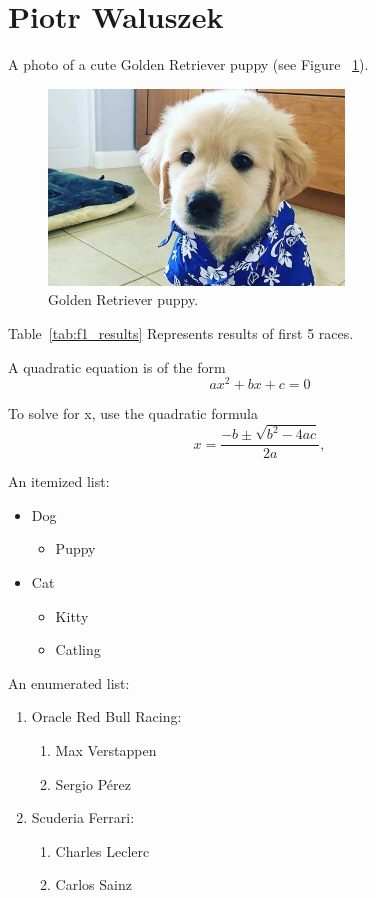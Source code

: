 \section{Piotr Waluszek}
\label{sec:piotrwalu}

A photo of a cute Golden Retriever puppy (see Figure ~\ref{fig:puppy}).

\begin{figure}[htbp]
    \centering
    \includegraphics[width=0.7\textwidth]{pictures/golden_retriever.jpg}
    \caption{Golden Retriever puppy.}
    \label{fig:puppy}
\end{figure}

Table~\ref{tab:f1_results} Represents results of first 5 races.



A quadratic equation is of the form \[ax^2 + bx + c =0 \]

To solve for x, use the quadratic formula $$x = \frac {-b \pm \sqrt{b^2 -4ac}} {2a},$$ 

 An itemized list:
\begin{itemize}
   \item Dog
      \begin{itemize}
     \item Puppy
    \end{itemize}
   \item Cat
   \begin{itemize}
     \item Kitty
     \item Catling
    \end{itemize}
\end{itemize}


An enumerated list:
\begin{enumerate}
   \item Oracle Red Bull Racing:
   \begin{enumerate}
     \item Max Verstappen
     \item Sergio Pérez
   \end{enumerate}
   \item Scuderia Ferrari:
   \begin{enumerate}
     \item Charles Leclerc
     \item Carlos Sainz
   \end{enumerate}
\end{enumerate}

